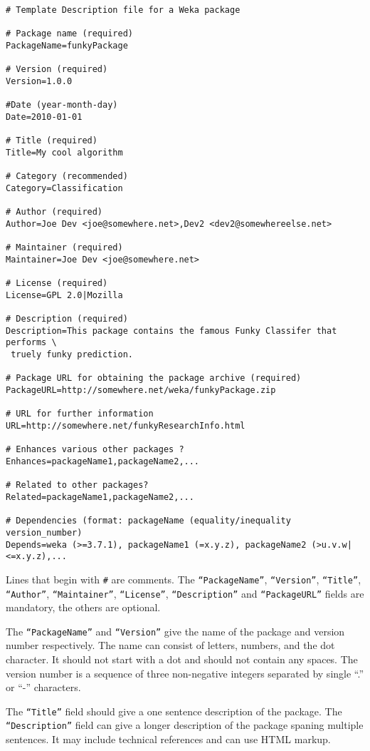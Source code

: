 {\scriptsize
\begin{verbatim}
# Template Description file for a Weka package

# Package name (required)
PackageName=funkyPackage

# Version (required)
Version=1.0.0

#Date (year-month-day)
Date=2010-01-01

# Title (required)
Title=My cool algorithm

# Category (recommended)
Category=Classification

# Author (required)
Author=Joe Dev <joe@somewhere.net>,Dev2 <dev2@somewhereelse.net>

# Maintainer (required)
Maintainer=Joe Dev <joe@somewhere.net>

# License (required)
License=GPL 2.0|Mozilla

# Description (required)
Description=This package contains the famous Funky Classifer that performs \
 truely funky prediction.

# Package URL for obtaining the package archive (required)
PackageURL=http://somewhere.net/weka/funkyPackage.zip

# URL for further information
URL=http://somewhere.net/funkyResearchInfo.html

# Enhances various other packages ?
Enhances=packageName1,packageName2,...

# Related to other packages?
Related=packageName1,packageName2,...

# Dependencies (format: packageName (equality/inequality version_number)
Depends=weka (>=3.7.1), packageName1 (=x.y.z), packageName2 (>u.v.w|<=x.y.z),...
\end{verbatim}}

Lines that begin with \verb=#= are comments. The
\texttt{``PackageName''}, \texttt{``Version''}, \texttt{``Title''},
\texttt{``Author''}, \texttt{``Maintainer''}, \texttt{``License''},
\texttt{``Description''} and \texttt{``PackageURL''} fields are
mandatory, the others are optional.

The \texttt{``PackageName''} and \texttt{``Version''} give the name
of the package and version number respectively. The name can consist of
letters, numbers, and the dot character. It should not start with a dot
and should not contain any spaces. The version number is a sequence of
three non-negative integers separated by single ``.'' or ``-'' characters.

The \texttt{``Title''} field should give a one sentence description of
the package. The \texttt{``Description''} field can give a longer
description of the package spaning multiple sentences. It may include
technical references and can use HTML markup.

